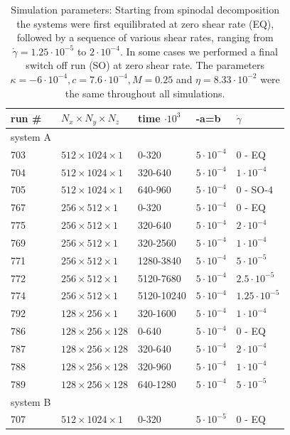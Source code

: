\documentclass[8.5pt,twoside,twocolumn]{article}
\begin{document}
\begin{table}[htp]
\small
\caption{Simulation parameters: Starting from spinodal decomposition the systems were first equilibrated at zero shear rate (EQ), followed by a sequence of various shear rates, ranging from $\dot{\gamma}=1.25\cdot10^{-5}$ to $2\cdot10^{-4}$. In some cases we performed a final switch off run (SO) at zero shear rate. The parameters $\kappa=-6\cdot10^{-4}, c=7.6\cdot10^{-4}, M=0.25$ and $\eta=8.33\cdot10^{-2}$ were the same throughout all simulations.}
\label{tab1}
\begin{tabular*}{0.495\textwidth}{lllll}
\hline
run \# & $N_x\times N_y\times N_z$ & time $\cdot 10^3$ & -a=b &  $\dot\gamma$\\
\hline
system A & & & &\\
\hline 
703 & $512\times1024\times1$ & 0-320 & $5\cdot10^{-4}$ & 0 - EQ  \\
704 & $512\times1024\times1$ & 320-640& $5\cdot10^{-4}$ & $1\cdot10^{-4}$\\
705 & $512\times1024\times1$ & 640-960& $5\cdot10^{-4}$ & 0 - SO-4 \\
\hline
767 & $256\times512\times1$ & 0-320 & $5\cdot10^{-4}$  & 0 - EQ\\
775 & $256\times512\times1$ & 320-640& $5\cdot10^{-4}$ & $2\cdot 10^{-4}$ \\
769 & $256\times512\times1$ & 320-2560& $5\cdot10^{-4}$ & $1\cdot 10^{-4}$ \\
771 & $256\times512\times1$ & 1280-3840& $5\cdot10^{-4}$ & $ 5\cdot10^{-5}$ \\
772 & $256\times512\times1$ & 5120-7680& $5\cdot10^{-4}$ & $ 2.5\cdot10^{-5}$ \\
774 & $256\times512\times1$ & 5120-10240& $5\cdot10^{-4}$ & $1.25\cdot10^{-5}$ \\
\hline
792 & $128\times256\times1$ & 320-1600& $5\cdot10^{-4}$ & $1\cdot10^{-4}$ \\
\hline
786 & $128\times256\times128$ & 0-640 & $5\cdot10^{-4}$ & 0 - EQ\\
787 & $128\times256\times128$ & 320-640 & $5\cdot10^{-4}$ & $2\cdot 10^{-4}$\\
788 & $128\times256\times128$ & 320-960 & $5\cdot10^{-4}$ & $1\cdot 10^{-4}$\\
789 & $128\times256\times128$ & 640-1280 & $5\cdot10^{-4}$ & $5\cdot 10^{-5}$\\
\hline
system B & & & &\\
\hline
707 & $512\times1024\times1$ & 0-320 & $5\cdot10^{-5}$ & 0 - EQ \\

\end{tabular*}
\end{table}
\end{document}
